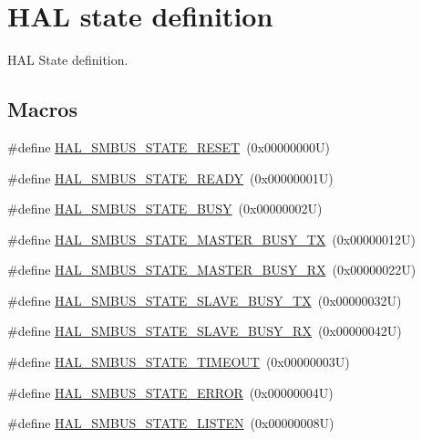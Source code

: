 \hypertarget{group___h_a_l__state__definition}{}\section{H\+AL state definition}
\label{group___h_a_l__state__definition}


H\+AL State definition.  


\subsection*{Macros}
\begin{DoxyCompactItemize}
\item 
\#define \hyperlink{group___h_a_l__state__definition_ga10d0d653875df77cad851a38a0ebead9}{H\+A\+L\+\_\+\+S\+M\+B\+U\+S\+\_\+\+S\+T\+A\+T\+E\+\_\+\+R\+E\+S\+ET}~(0x00000000\+U)
\item 
\#define \hyperlink{group___h_a_l__state__definition_gabb10e7cef181e43e110625e3b5ae16d7}{H\+A\+L\+\_\+\+S\+M\+B\+U\+S\+\_\+\+S\+T\+A\+T\+E\+\_\+\+R\+E\+A\+DY}~(0x00000001\+U)
\item 
\#define \hyperlink{group___h_a_l__state__definition_gab00e1c7c59808e236d885eb31685271f}{H\+A\+L\+\_\+\+S\+M\+B\+U\+S\+\_\+\+S\+T\+A\+T\+E\+\_\+\+B\+U\+SY}~(0x00000002\+U)
\item 
\#define \hyperlink{group___h_a_l__state__definition_gafa8e5febd1f304c7d7f374a59425935e}{H\+A\+L\+\_\+\+S\+M\+B\+U\+S\+\_\+\+S\+T\+A\+T\+E\+\_\+\+M\+A\+S\+T\+E\+R\+\_\+\+B\+U\+S\+Y\+\_\+\+TX}~(0x00000012\+U)
\item 
\#define \hyperlink{group___h_a_l__state__definition_gacfd201294291c00d2c69772382650717}{H\+A\+L\+\_\+\+S\+M\+B\+U\+S\+\_\+\+S\+T\+A\+T\+E\+\_\+\+M\+A\+S\+T\+E\+R\+\_\+\+B\+U\+S\+Y\+\_\+\+RX}~(0x00000022\+U)
\item 
\#define \hyperlink{group___h_a_l__state__definition_ga775a709e94bcbd38acd807096d6cd518}{H\+A\+L\+\_\+\+S\+M\+B\+U\+S\+\_\+\+S\+T\+A\+T\+E\+\_\+\+S\+L\+A\+V\+E\+\_\+\+B\+U\+S\+Y\+\_\+\+TX}~(0x00000032\+U)
\item 
\#define \hyperlink{group___h_a_l__state__definition_ga04529c2b1054f3be65c64fa1d5c32360}{H\+A\+L\+\_\+\+S\+M\+B\+U\+S\+\_\+\+S\+T\+A\+T\+E\+\_\+\+S\+L\+A\+V\+E\+\_\+\+B\+U\+S\+Y\+\_\+\+RX}~(0x00000042\+U)
\item 
\#define \hyperlink{group___h_a_l__state__definition_ga49f6063d784b0ffe5a878eaac17d29d7}{H\+A\+L\+\_\+\+S\+M\+B\+U\+S\+\_\+\+S\+T\+A\+T\+E\+\_\+\+T\+I\+M\+E\+O\+UT}~(0x00000003\+U)
\item 
\#define \hyperlink{group___h_a_l__state__definition_gad370e2f7efee2e9a1b62e766f849a2aa}{H\+A\+L\+\_\+\+S\+M\+B\+U\+S\+\_\+\+S\+T\+A\+T\+E\+\_\+\+E\+R\+R\+OR}~(0x00000004\+U)
\item 
\#define \hyperlink{group___h_a_l__state__definition_gad20bc91031bbc73a2ac7221ee8514305}{H\+A\+L\+\_\+\+S\+M\+B\+U\+S\+\_\+\+S\+T\+A\+T\+E\+\_\+\+L\+I\+S\+T\+EN}~(0x00000008\+U)
\end{DoxyCompactItemize}


